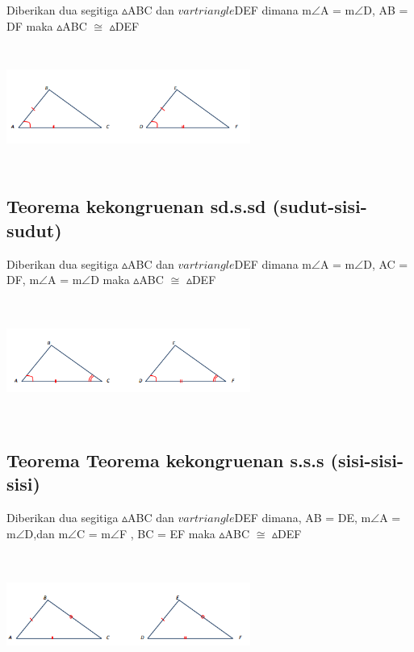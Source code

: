 \documentclass[11pt,fleqn]{book} %
\begin{document}
\begin{theorem}

Diberikan dua segitiga $\vartriangle $ABC dan $vartriangle $DEF dimana m$\angle$A = m$\angle$D, AB = DF maka $\vartriangle $ABC $\cong$ $\vartriangle $DEF
\end{theorem}
\includegraphics[width = 8cm, height= 4cm]{Pictures/4.png}
\subsection{Teorema kekongruenan sd.s.sd (sudut-sisi-sudut)}
\begin{theorem}
Diberikan dua segitiga $\vartriangle $ABC dan $vartriangle $DEF dimana m$\angle$A = m$\angle$D, AC = DF, m$\angle$A = m$\angle$D maka $\vartriangle $ABC $\cong$ $\vartriangle $DEF
\end{theorem}
\includegraphics[width = 8cm, height= 4cm]{Pictures/5.png}


\subsection{Teorema Teorema kekongruenan s.s.s (sisi-sisi-sisi)}
\begin{theorem}
Diberikan dua segitiga $\vartriangle $ABC dan $vartriangle $DEF dimana, AB = DE,  m$\angle$A = m$\angle$D,dan  m$\angle$C = m$\angle$F , BC = EF  maka $\vartriangle $ABC $\cong$ $\vartriangle $DEF
\end{theorem}
\includegraphics[width = 8cm, height= 4cm]{Pictures/6.png}
\end{document}
